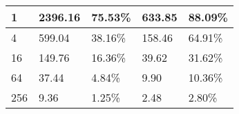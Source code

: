 \begin{table}[]
\begin{tabular}{|l|l|l|l|l|}
1                                                                                              & 2396.16                                                                                                        & 75.53\%                                                                                                                                            & 633.85 & 88.09\%                                                                                                                                              \\ \hline
4                                                                                              & 599.04                                                                                                         & 38.16\%                                                                                                                                             & 158.46 & 64.91\%                                                                                                                                              \\ \hline
16                                                                                             & 149.76                                                                                                         & 16.36\%                                                                                                                                             & 39.62 & 31.62\%                                                                                                                                               \\ \hline
64                                                                                             & 37.44                                                                                                          & 4.84\%                                                                                                                                              & 9.90                                                                                         & 10.36\%                                                                                                                                               \\ \hline
256                                                                                            & 9.36                                                                                                          & 1.25\%                                                                                                                                             & 2.48                                                                                         & 2.80\%                                                                                                                                               \\ \hline

\end{tabular}
\end{table}

